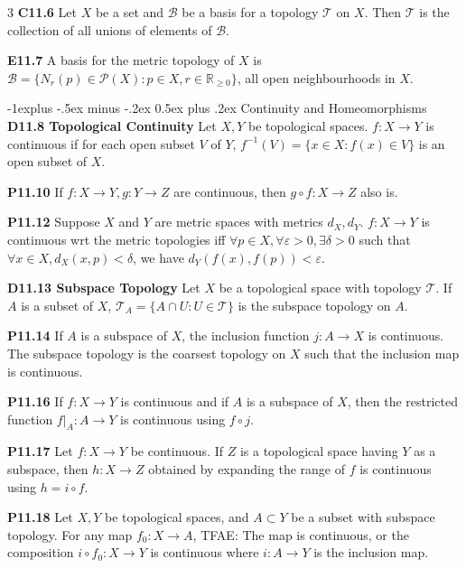 \documentclass[10pt, landscape]{article}
\makeatletter
\renewcommand{\section}{\@startsection{section}{1}{0mm}%
                                {-1ex plus -.5ex minus -.2ex}%
                                {0.5ex plus .2ex}%
                                {\normalfont\large\bfseries}}
\renewcommand{\section}{\@startsection{section}{2}{0mm}%
                                {-1explus -.5ex minus -.2ex}%
                                {0.5ex plus .2ex}%
                                {\normalfont\normalsize\bfseries}}
\makeatother
\begin{document}
\begin{multicols*}{3}
\textbf{C11.6} Let $X$ be a set and $\mathcal{B}$ be a basis for a topology $\mathcal{T}$ on $X$. Then $\mathcal{T}$ is the collection of all unions of elements of $\mathcal{B}$.

\textbf{E11.7} A basis for the metric topology of $X$ is $\mathcal{B}=\{N_r(p) \in \mathcal{P}(X):p \in X, r \in \mathbb{R}_{\geq0}\}$, all open neighbourhoods in $X$.

\section{Continuity and Homeomorphisms}
\textbf{D11.8 Topological Continuity} Let $X, Y$ be topological spaces. $f: X \rightarrow Y$ is continuous if for each open subset $V$ of $Y$, $f^{-1}(V) = \{x \in X:f(x) \in V\}$ is an open subset of $X$.

\textbf{P11.10} If $f:X \rightarrow Y, g: Y \rightarrow Z$ are continuous, then $g \circ f: X \rightarrow Z$ also is.

\textbf{P11.12} Suppose $X$ and $Y$ are metric spaces with metrics $d_X, d_Y$. $f:X \rightarrow Y$ is continuous wrt the metric topologies iff $\forall p \in X, \forall \varepsilon >0, \exists \delta > 0$ such that $\forall x \in X, d_X(x, p) < \delta$, we have $d_Y(f(x), f(p)) < \varepsilon$.

\textbf{D11.13 Subspace Topology} Let $X$ be a topological space with topology $\mathcal{T}$. If $A$ is a subset of $X$, $\mathcal{T}_A=\{A \cap U: U \in \mathcal{T}\}$ is the subspace topology on $A$.

\textbf{P11.14} If $A$ is a subspace of $X$, the inclusion function $j: A \rightarrow X$ is continuous. The subspace topology is the coarsest topology on $X$ such that the inclusion map is continuous.

\textbf{P11.16} If $f: X \rightarrow Y$ is continuous and if $A$ is a subspace of $X$, then the restricted function $f|_A:A \rightarrow Y$ is continuous using $f \circ j$.

\textbf{P11.17} Let $f:X \rightarrow Y$ be continuous. If $Z$ is a topological space having $Y$ as a subspace, then $h: X \rightarrow Z$ obtained by expanding the range of $f$ is continuous using $h=i\circ f$.

\textbf{P11.18} Let $X,Y$ be topological spaces, and $A \subset Y$ be a subset with subspace topology. For any map $f_0: X \rightarrow A$, TFAE: The map is continuous, or the composition $i \circ f_0 : X \rightarrow Y$ is continuous where $i : A \rightarrow Y$ is the inclusion map.


\end{multicols*}
\end{document}
